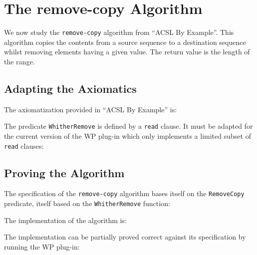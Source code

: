 \section{The \textsf{remove-copy} Algorithm}
\label{remove-copy}

We now study the \texttt{remove-copy} algorithm from ``ACSL By Example''.
This algorithm copies the contents from a source sequence to a destination
sequence whilst removing elements having a given value. The return value is the
length of the range.

\subsection{Adapting the Axiomatics}

The axiomatization provided in ``ACSL By Example'' is:


The predicate \texttt{WhitherRemove} is defined by a \texttt{read} clause.
It must be adapted for the current version of the \textsf{WP} plug-in which
only implements a limited subset of \texttt{read} clauses:


\subsection{Proving the Algorithm}

The specification of the \texttt{remove-copy} algorithm bases itself on the
\texttt{RemoveCopy} predicate, itself based on the \texttt{WhitherRemove}
function:


The implementation of the algorithm is:


\clearpage
The implementation can be partially proved correct against its specification by
running the \textsf{WP} plug-in: 
